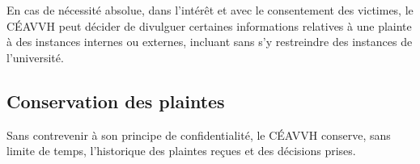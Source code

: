 \documentclass{aediroum}
\begin{document}
En cas de nécessité absolue, dans l’intérêt et avec le consentement des victimes, le CÉAVVH peut décider de divulguer certaines informations relatives à une plainte à des instances internes ou externes, incluant sans s’y restreindre des instances de l’université.

\subsection{Conservation des plaintes}

Sans contrevenir à son principe de confidentialité, le CÉAVVH conserve, sans limite de temps, l’historique des plaintes reçues et des décisions prises.
\end{document}
